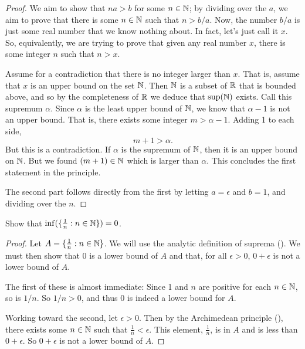 \documentclass[11pt,twoside=off,numbers=noenddot]{scrbook}
\begin{document}
\begin{proof}
    We aim to show that $na > b$ for some $n \in \mathbb N$; by dividing over the $a$, we aim to prove that there is some $n \in \mathbb N$ such that $n > b/a$. Now, the number $b/a$ is just some real number that we know nothing about. In fact, let's just call it $x$. So, equivalently, we are trying to prove that given any real number $x$, there is some integer $n$ such that $n > x$.

    Assume for a contradiction that there is no integer larger than $x$. That is, assume that $x$ is an upper bound on the set $\mathbb N$. Then $\mathbb N$ is a subset of $\mathbb R$ that is bounded above, and so by the completeness of $\mathbb R$ we deduce that $\sup(\mathbb N)$ exists. Call this supremum $\alpha$. Since $\alpha$ is the least upper bound of $\mathbb N$, we know that $\alpha - 1$ is not an upper bound. That is, there exists some integer $m > \alpha - 1$. Adding 1 to each side,
    \[ m + 1 > \alpha. \]
    But this is a contradiction. If $\alpha$ is the supremum of $\mathbb N$, then it is an upper bound on $\mathbb N$. But we found $(m + 1) \in \mathbb N$ which is larger than $\alpha$. This concludes the first statement in the principle.

    The second part follows directly from the first by letting $a = \epsilon$ and $b = 1$, and dividing over the $n$.
\end{proof}

\begin{example}
    Show that $\inf(\{ \frac{1}{n} : n \in \mathbb N \}) = 0$.
    \begin{proof}
        Let $A = \{ \frac{1}{n} : n \in \mathbb N \}$. We will use the analytic definition of suprema (). We must then show that 0 is a lower bound of $A$ and that, for all $\epsilon > 0$, $0 + \epsilon$ is not a lower bound of $A$.

        The first of these is almost immediate: Since 1 and $n$ are positive for each $n \in \mathbb N$, so is $1/n$. So $1/n > 0$, and thus 0 is indeed a lower bound for $A$.

        Working toward the second, let $\epsilon > 0$. Then by the Archimedean principle (), there exists some $n \in \mathbb N$ such that $\frac{1}{n} < \epsilon$. This element, $\frac{1}{n}$, is in $A$ and is less than $0 + \epsilon$. So $0 + \epsilon$ is not a lower bound of $A$.
    \end{proof}
\end{example}
\end{document}
